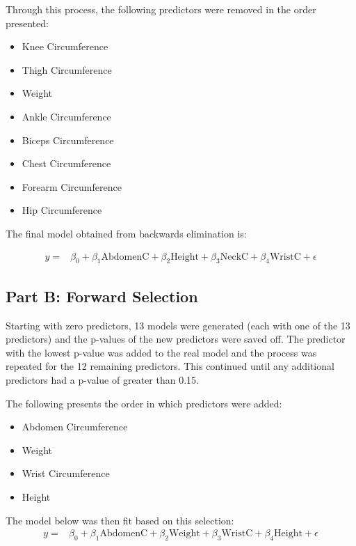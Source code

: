 \documentclass[a4paper, 11pt]{article}
\begin{document}
Through this process, the following predictors were removed in the order presented:
\begin{itemize}
	\setlength\itemsep{0em}
	\item Knee Circumference
	\item Thigh Circumference
	\item Weight
	\item Ankle Circumference
	\item Biceps Circumference
	\item Chest Circumference
	\item Forearm Circumference
	\item Hip Circumference
\end{itemize}

The final model obtained from backwards elimination is:

\begin{align*}
	y = & \beta_0 + \beta_1\text{AbdomenC} + \beta_2\text{Height} + \beta_3\text{NeckC} + \beta_4\text{WristC} + \epsilon
\end{align*}

\subsection*{Part B: Forward Selection}
Starting with zero predictors, 13 models were generated (each with one of the 13 predictors) and the p-values of the new predictors were saved off. The predictor with the lowest p-value was added to the real model and the process was repeated for the 12 remaining predictors. This continued until any additional predictors had a p-value of greater than 0.15.

The following presents the order in which predictors were added:
\begin{itemize}
	\setlength\itemsep{0em}
	\item Abdomen Circumference
	\item Weight
	\item Wrist Circumference
	\item Height
\end{itemize}

The model below was then fit based on this selection:
\begin{align*}
	y = & \beta_0 + \beta_1\text{AbdomenC} + \beta_2\text{Weight} + \beta_3\text{WristC} + \beta_4\text{Height} + \epsilon
\end{align*}
\end{document}
